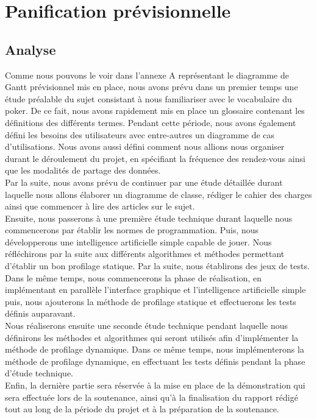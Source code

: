\documentclass{report}
\begin{document}
\chapter{Panification prévisionnelle}
\section{Analyse}
\hspace{0.5cm}Comme nous pouvons le voir dans l'annexe A représentant le diagramme de Gantt prévisionnel mis en place, nous avons prévu dans un premier temps une étude préalable du sujet consistant à nous familiariser avec le vocabulaire du poker. De ce fait, nous avons rapidement mis en place un glossaire contenant les définitions des différents termes. Pendant cette période, nous avons également défini les besoins des utilisateurs avec entre-autres un diagramme de cas d'utilisations. Nous avons aussi défini comment nous allions nous organiser durant le déroulement du projet, en spécifiant la fréquence des rendez-vous ainsi que les modalités de partage des données.\\

Par la suite, nous avons prévu de continuer par une étude détaillée durant laquelle nous allons élaborer un diagramme de classe, rédiger le cahier des charges ainsi que commencer à lire des articles sur le sujet.\\

Ensuite, nous passerons à une première étude technique durant laquelle nous commencerons par établir les normes de programmation. Puis, nous développerons une intelligence artificielle simple capable de jouer. Nous réfléchirons par la suite aux différents algorithmes et méthodes permettant d'établir un bon profilage statique. Par la suite, nous établirons des jeux de tests. Dans le même temps, nous commencerons la phase de réalisation, en implémentant en parallèle l'interface graphique et l'intelligence artificielle simple puis, nous ajouterons la méthode de profilage statique et effectuerons les tests définis auparavant.\\

Nous réaliserons ensuite une seconde étude technique pendant laquelle nous définirons les méthodes et algorithmes qui seront utilisés afin d'implémenter la méthode de profilage dynamique. Dans ce même temps, nous implémenterons la méthode de profilage dynamique, en effectuant les tests définis pendant la phase d'étude technique.\\

Enfin, la dernière partie sera réservée à la mise en place de la démonstration qui sera effectuée lors de la soutenance, ainsi qu'à la finalisation du rapport rédigé tout au long de la période du projet et à la préparation de la soutenance.\par
\end{document}
